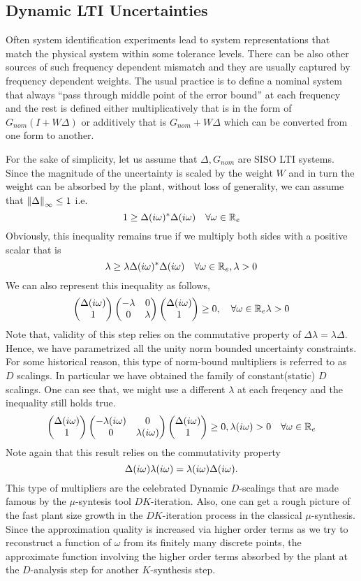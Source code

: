 \subsection{Dynamic LTI Uncertainties}
Often system identification experiments lead to system representations that match the physical 
system within some tolerance levels. There can be also other sources of such frequency dependent 
mismatch and they are usually captured by frequency dependent weights. The usual practice 
is to define a nominal system that always ``pass through middle point of the error bound'' at 
each frequency and the rest is defined either multiplicatively that is in the form of $G_{nom}
(I+W\Delta)$ or additively that is $G_{nom} + W\Delta$ which can be converted from one form to 
another. 

For the sake of simplicity, let us assume that $\Delta, G_{nom}$ are SISO LTI systems. Since the 
magnitude of the uncertainty is scaled by the weight $W$ and in turn the weight can be absorbed
by the plant, without loss of generality, we can assume 
that $\displaystyle \left\| \Delta \right\|_\infty\leq 1$ i.e. 
\[
1 \geq \Delta(i\omega)^*\Delta(i\omega) \quad \forall \omega\in\mathbb{R}_e
\]
Obviously, this inequality remains true if we multiply both sides with a positive scalar that is
\[
\lambda \geq \lambda\Delta(i\omega)^*\Delta(i\omega) \quad \forall \omega\in\mathbb{R}_e ,\lambda>0
\]
We can also represent this inequality as follows,
\[
\begin{pmatrix}\Delta(i\omega) \\ 1\end{pmatrix}\begin{pmatrix}-\lambda &0\\0 &\lambda\end{pmatrix}\begin{pmatrix}\Delta(i\omega) \\ 1\end{pmatrix}\geq 0, \quad 
\forall \omega\in\mathbb{R}_e \lambda>0
\]
Note that, validity of this step relies on the commutative property of 
$\Delta \lambda = \lambda\Delta$. Hence, we have parametrized all the unity
norm bounded uncertainty constraints. For some historical reason, this type 
of norm-bound multipliers is referred to as $D$ scalings. In particular we have obtained 
the family of constant(static) $D$ scalings. 
One can see that, we might use a different $\lambda$ at each freqency and the inequality 
still holds true. 
\[
\begin{pmatrix}\Delta(i\omega) \\ 1\end{pmatrix}\begin{pmatrix}-\lambda(i\omega) &0\\0 &\lambda(i\omega)\end{pmatrix}\begin{pmatrix}\Delta(i\omega) \\ 1\end{pmatrix}\geq 0, \lambda(i\omega)>0
\quad \forall \omega\in\mathbb{R}_e 
\]
Note again that this result relies on the commutativity property 
\[\Delta(i\omega)\lambda(i\omega) = \lambda(i\omega)\Delta(i\omega).
\] 
This type of multipliers are the celebrated Dynamic $D$-scalings 
that are made famous by the $\mu$-syntesis tool $DK$-iteration. Also, one can get a rough 
picture of the fast plant size growth in the $DK$-iteration process in the classical 
$\mu$-synthesis. Since the approximation quality is increased via higher order terms as we try
to reconstruct a function of $\omega$ from its finitely many discrete points, 
the approximate function involving the higher order terms absorbed by the plant at the $D$-analysis 
step for another $K$-synthesis step.




